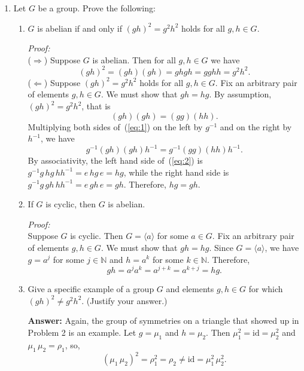 \documentclass[12pt]{article}
\newcommand{\<}{\ensuremath{\langle}}
\renewcommand{\>}{\ensuremath{\rangle}}
\newcommand{\N}{\ensuremath{\mathbb{N}}}
\begin{document}
\begin{enumerate}[{\bf 1.}]
\item %
  Let $G$ be a group.  Prove the following:
  \begin{enumerate}
  \item $G$ is abelian if and only if $(gh)^2 = g^2h^2$ holds for all $g, h \in G$.

    \medskip

    {\it Proof:}\\
    ($\Rightarrow$) Suppose $G$ is abelian.  Then for all $g, h \in G$ we have 
    \[
    (gh)^2 = (gh)(gh) = ghgh = gghh = g^2h^2.
    \]
    ($\Leftarrow$) Suppose $(gh)^2 = g^2h^2$ holds for all $g, h \in G$. 
    Fix an arbitrary pair of elements $g, h \in G$.  We must show that
    $gh = hg$. By assumption, $(gh)^2 = g^2h^2$, that is
    \begin{equation}
      \label{eq:1}
    (gh)(gh) =  (gg)(hh).
    \end{equation}
    Multiplying both sides of~(\ref{eq:1}) on the left by $g^{-1}$ and on the
    right by $h^{-1}$, we have
    \begin{equation}
      \label{eq:2}
      g^{-1}(gh)(gh)h^{-1} = g^{-1}(gg)(hh)h^{-1}.
    \end{equation}
    By associativity, the left hand side of~(\ref{eq:2}) is
    $g^{-1}g \, hg \,hh^{-1} = e\, hg\, e = hg$, while the right hand side 
    is
    $g^{-1}g \, gh \,hh^{-1} = e\, gh\, e = gh$.
    Therefore, $hg = gh$. 

    \vskip1cm

  \item If $G$ is cyclic, then $G$ is abelian.

    \medskip

    {\it Proof:}\\
    Suppose $G$ is cyclic.  Then $G = \<a\>$ for some $a \in G$.
    Fix an arbitrary pair of elements $g, h \in G$.  We must show that
    $gh = hg$.  Since $G = \<a\>$, we have $g = a^j$ for some $j\in \N$ and 
    $h = a^k$ for some $k\in \N$.  Therefore, 
    \[
    gh = a^j a^k = a^{j+k} = a^{k+j} = hg.
    \]

    \vskip1cm

  \item Give a specific example of a group $G$ and elements $g, h \in G$ for which $(gh)^2 \neq g^2h^2$. 
    (Justify your answer.)

    \medskip

    {\bf Answer:} Again, the group of symmetries on a triangle that showed up in
    Problem 2 is an example.  Let $g = \mu_1$ and $h = \mu_2$.  Then
    $\mu_1^2 = \mathrm{id} = \mu_2^2$ and $\mu_1 \,\mu_2 = \rho_1$, so,
    \[
    (\mu_1\, \mu_2)^2 = \rho_1^2 = \rho_2 \neq \mathrm{id} = \mu_1^2 \, \mu_2^2.
    \]


\end{enumerate}
\end{enumerate}
\end{document}
